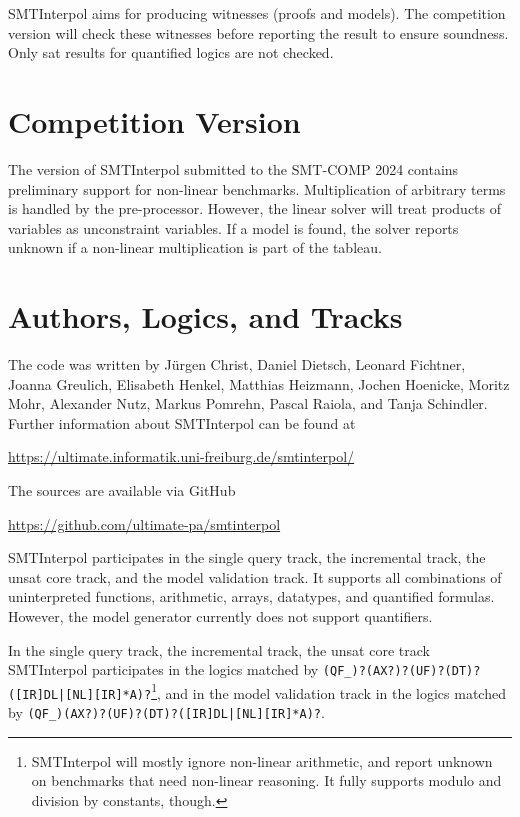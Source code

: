 \documentclass[a4paper]{easychair}
\newcommand\SI{SMTInterpol\xspace}
\begin{document}
\SI aims for producing witnesses (proofs and models).  The competition version will check these witnesses before reporting the result to ensure soundness.  Only sat results for quantified logics are not checked.


\section*{Competition Version}
The version of \SI submitted to the SMT-COMP 2024 contains
preliminary support for non-linear benchmarks.  Multiplication of arbitrary terms is handled by the pre-processor.  However, the linear solver will treat products of variables as unconstraint variables.  If a model is found, the solver reports unknown if a non-linear multiplication is part of the tableau.

\section*{Authors, Logics, and Tracks}
The code was written by J{\"u}rgen Christ, Daniel Dietsch, Leonard Fichtner, Joanna Greulich, Elisabeth Henkel, Matthias Heizmann, Jochen Hoenicke, Moritz Mohr, Alexander Nutz, Markus Pomrehn, Pascal Raiola, and Tanja Schindler.
Further information about \SI can be found at
\begin{center}
  \url{https://ultimate.informatik.uni-freiburg.de/smtinterpol/}
\end{center}
The sources are available via GitHub
\begin{center}
  \url{https://github.com/ultimate-pa/smtinterpol}
\end{center}

\SI participates in the single query track, the incremental track, the unsat core track, and the model validation track.
It supports all combinations of uninterpreted functions, arithmetic, arrays, datatypes, and quantified formulas.
However, the model generator currently does not support quantifiers.

In the single query track, the incremental track, the unsat core track \SI participates in the logics matched by
\verb!(QF_)?(AX?)?(UF)?(DT)?([IR]DL|[NL][IR]*A)?!\footnote{\SI will mostly ignore non-linear arithmetic, and report unknown on benchmarks that need non-linear reasoning.  It fully supports modulo and division by constants, though.},
and in the model validation track in the logics matched by
\verb!(QF_)(AX?)?(UF)?(DT)?([IR]DL|[NL][IR]*A)?!.



\end{document}
